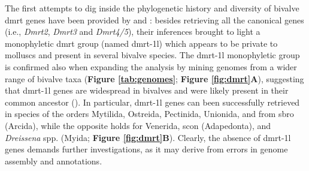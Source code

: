 \documentclass[../main.tex]{subfiles}
\begin{document}
The first attempts to dig inside the phylogenetic history and diversity of bivalve \gls{dmrt} genes have been provided by \textbf{\cite{li2018foxl2}} and \textbf{\cite{evensen2022comparative}}: besides retrieving all the canonical genes (i.e., \textit{Dmrt2}, \textit{Dmrt3} and \textit{Dmrt4/5}), their inferences brought to light a monophyletic \gls{dmrt} group (named \gls{dmrt-1l}) which appears to be private to molluscs and present in several bivalve species. The \gls{dmrt-1l} monophyletic group is confirmed also when expanding the analysis by mining genomes from a wider range of bivalve taxa (\textbf{Figure \ref{tab:genomes}}; \textbf{Figure \ref{fig:dmrt}A}), suggesting that \gls{dmrt-1l} genes are widespread in bivalves and were likely present in their common ancestor (\textbf{\cite{evensen2022comparative}}). In particular, \gls{dmrt-1l} genes can been successfully retrieved in species of the orders Mytilida, Ostreida, Pectinida, Unionida, and from \gls{sbro} (Arcida), while the opposite holds for Venerida, \gls{scon} (Adapedonta), and \textit{Dreissena} spp. (Myida; \textbf{Figure \ref{fig:dmrt}B}). Clearly, the absence of \gls{dmrt-1l} genes demands further investigations, as it may derive from errors in genome assembly and annotations.
\end{document}
